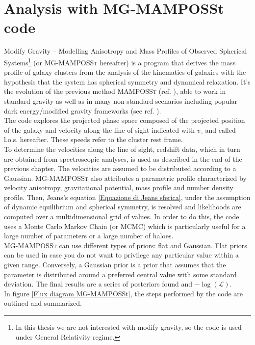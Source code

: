 \chapter{Analysis with MG-MAMPOSSt code}\label{Capitolo4}

Modify Gravity -- Modelling Anisotropy and Mass Profiles of Observed Spherical Systems\footnote{In this thesis we are not interested with modify gravity, so the code is used under General Relativity regime.} (or \textsc{MG-MAMPOSSt} hereafter) is a program that derives the mass profile of galaxy clusters from the analysis of the kinematics of galaxies with the hypothesis that the system has spherical symmetry and dynamical relaxation. It's the evolution of the previous method \textsc{MAMPOSSt} (ref. \cite{Biviano_MAMPOSSt}), able to work in standard gravity as well as in many non-standard scenarios including popular dark energy/modified gravity frameworks (see ref. \cite{pizzuti2022mgmamposstcodetestgravity}).\\ 
The code explores the projected phase space composed of the projected position of the galaxy and velocity along the line of sight indicated with $v_z$ and called l.o.s. hereafter. These speeds refer to the cluster rest frame.\\
To determine the velocities along the line of sight, redshift data, which in turn are obtained from spectroscopic analyses, is used as described in the end of the previous chapter. The velocities are assumed to be distributed according to a Gaussian.
\textsc{MG-MAMPOSSt} also attributes a parametric profile characterized by velocity anisotropy, gravitational potential, mass profile and number density profile. Then, Jeans's equation \eqref{Equazione di Jeans sferica}, under the assumption of dynamic equilibrium and spherical symmetry, is resolved and likelihoods are computed over a multidimensional grid of values. In order to do this, the code uses a Monte Carlo Markov Chain (or MCMC) which is particularly useful for a large number of parameters or a large number of haloes.\\ 
\textsc{MG-MAMPOSSt} can use different types of priors: flat and Gaussian. Flat priors can be used in case you do not want to privilege any particular value within a given range. Conversely, a Gaussian prior is a prior that assumes that the parameter is distributed around a preferred central value with some standard deviation. 
The final results are a series of posteriors found and $- \log(\mathcal{L})$.\\
In figure \ref{Flux diagram MG-MAMPOSSt}, the steps performed by the code are outlined and summarized.
